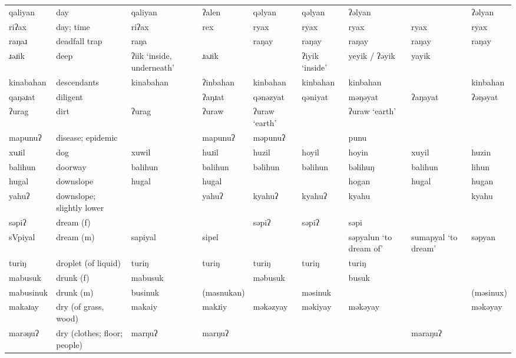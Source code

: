 \begin{landscape}
\begin{longtable}{*{9}{>{\raggedright\arraybackslash}p{}}}
\text{*}qaliyan      & day & qaliyan & ʔalen & qəlyan & qəlyan & ʔəlyan &  & ʔəlyan\\
\text{*}riʔax        & day; time & riʔax & rex & ryax & ryax & ryax & ryax & ryax\\
\text{*}raŋaɹ        & deadfall trap & raŋa &  & raŋay & raŋay & raŋay & raŋay & raŋay\\
\text{*}ɹəɹik        & deep & ʔiik `inside, underneath' & ɹaɹik &  & ʔiyik `inside' & yeyik / ʔəyik & yayik & \\
\text{*}kinabahan    & descendants & kinabahan & ʔinbahan & kinbahan & kinbahan & kinbahan &  & kinbahan\\
\text{*}qaŋəɹat      & diligent &  & ʔaŋɹat & qənəzyat & qəniyat & məŋəyat & ʔaŋayat & ʔəŋəyat\\
\text{*}ʔurag        & dirt & ʔurag & ʔuraw & ʔuraw `earth' &  & ʔuraw `earth' &  & \\
\text{*}mapunuʔ      & disease; epidemic &  & mapunuʔ & məpunuʔ &  & punu &  & \\
\text{*}xuɹil        & dog & xuwil & huɹil & huzil & hoyil & hoyin & xuyil & huzin\\
\text{*}balihun      & doorway & balihun & balihun & bəlihun & bəlihun & bəlihuŋ & balihun & lihun\\
\text{*}hugal        & downslope & hugal & hugal &  &  & hogan & hugal & hugan\\
\text{*}yahuʔ        & downslope; slightly lower &  & yahuʔ & kyahuʔ & kyahuʔ & kyahu &  & kyahu\\
\text{*}səpiʔ        & dream (f) &  &  & səpiʔ & səpiʔ & səpi &  & \\
\text{*}sVpiyal      & dream (m) & sapiyal & sipel &  &  & səpyalun \newline `to dream of' & sumapyal \newline `to dream' & səpyan\\
\text{*}turiŋ        & droplet (of liquid) & turiŋ & turiŋ & turiŋ & turiŋ & turiŋ &  & \\
\text{*}mabusuk      & drunk (f) & mabusuk &  & məbusuk &  & busuk &  & \\
\text{*}mabusinuk    & drunk (m) & businuk & (masnukan) &  & məsinuk &  &  & (məsinux)\\
\text{*}makəɹay      & dry (of grass, wood) & makaiy & makɹiy & məkəzyay & məkiyay & məkəyay &  & məkəyay\\
\text{*}marəŋuʔ      & dry (clothes; floor; people) & marŋuʔ & marŋuʔ &  &  &  & maraŋuʔ & \\

\end{longtable}
\end{landscape}
